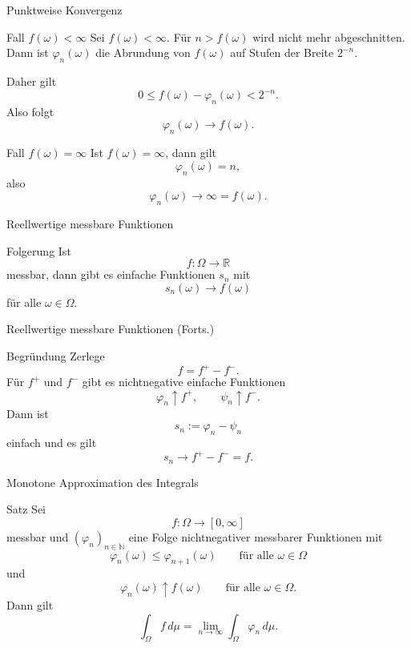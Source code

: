\documentclass{beamer}
\begin{document}
\begin{frame}{Punktweise Konvergenz}
\begin{block}{Fall \(f(\omega)<\infty\)}
Sei \(f(\omega)<\infty\). Für \(n>f(\omega)\) wird nicht mehr abgeschnitten.
Dann ist \(\varphi_n(\omega)\) die Abrundung von \(f(\omega)\) auf Stufen der Breite \(2^{-n}\).

Daher gilt
\[
0\le f(\omega)-\varphi_n(\omega)<2^{-n}.
\]
Also folgt
\[
\varphi_n(\omega)\to f(\omega).
\]
\end{block}

\begin{block}{Fall \(f(\omega)=\infty\)}
Ist \(f(\omega)=\infty\), dann gilt
\[
\varphi_n(\omega)=n,
\]
also
\[
\varphi_n(\omega)\to\infty=f(\omega).
\]
\end{block}
\end{frame}

\begin{frame}{Reellwertige messbare Funktionen}
\begin{block}{Folgerung}
Ist
\[
f\colon\Omega\to\mathbb R
\]
messbar, dann gibt es einfache Funktionen \(s_n\) mit
\[
s_n(\omega)\to f(\omega)
\]
für alle \(\omega\in\Omega\).
\end{block}
\end{frame}

\begin{frame}{Reellwertige messbare Funktionen (Forts.)}
\begin{block}{Begründung}
Zerlege
\[
f=f^+-f^-.
\]
Für \(f^+\) und \(f^-\) gibt es nichtnegative einfache Funktionen
\[
\varphi_n\uparrow f^+,
\qquad
\psi_n\uparrow f^-.
\]
Dann ist
\[
s_n:=\varphi_n-\psi_n
\]
einfach und es gilt
\[
s_n\to f^+-f^-=f.
\]
\end{block}
\end{frame}

\begin{frame}{Monotone Approximation des Integrals}
\begin{block}{Satz}
Sei
\[
f\colon \Omega\to[0,\infty]
\]
messbar und \((\varphi_n)_{n\in\mathbb N}\) eine Folge nichtnegativer messbarer Funktionen mit
\[
\varphi_n(\omega)\le \varphi_{n+1}(\omega)
\qquad\text{für alle } \omega\in\Omega
\]
und
\[
\varphi_n(\omega)\uparrow f(\omega)
\qquad\text{für alle } \omega\in\Omega.
\]
Dann gilt
\[
\int_\Omega f\,d\mu
=
\lim_{n\to\infty}\int_\Omega \varphi_n\,d\mu.
\]
\end{block}
\end{frame}
\end{document}
